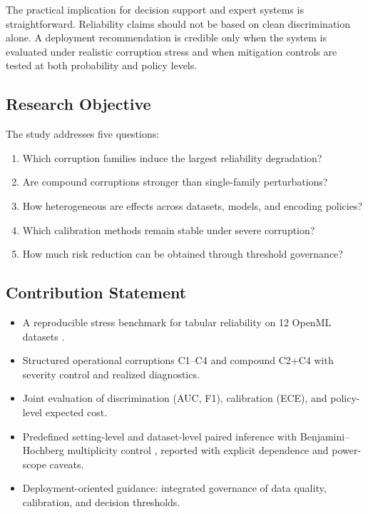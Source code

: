 \documentclass{AuthorGuide/ijitcs}
\begin{document}
The practical implication for decision support and expert systems is straightforward. Reliability claims should not be based on clean discrimination alone. A deployment recommendation is credible only when the system is evaluated under realistic corruption stress and when mitigation controls are tested at both probability and policy levels.

\subsection{Research Objective}
The study addresses five questions:
\begin{enumerate}
\item Which corruption families induce the largest reliability degradation?
\item Are compound corruptions stronger than single-family perturbations?
\item How heterogeneous are effects across datasets, models, and encoding policies?
\item Which calibration methods remain stable under severe corruption?
\item How much risk reduction can be obtained through threshold governance?
\end{enumerate}

\subsection{Contribution Statement}
\begin{itemize}
\item A reproducible stress benchmark for tabular reliability on 12 OpenML datasets \cite{vanschoren2014openml}.
\item Structured operational corruptions C1--C4 and compound C2+C4 with severity control and realized diagnostics.
\item Joint evaluation of discrimination (AUC, F1), calibration (ECE), and policy-level expected cost.
\item Predefined setting-level and dataset-level paired inference with Benjamini--Hochberg multiplicity control \cite{benjamini1995fdr}, reported with explicit dependence and power-scope caveats.
\item Deployment-oriented guidance: integrated governance of data quality, calibration, and decision thresholds.
\end{itemize}

\loadmaingeometry
\end{document}
